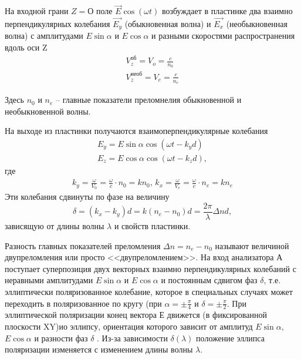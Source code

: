 На входной грани $Z=О$ поле $\vec{E}\cos(\omega t)$ возбуждает
в пластинке два взаимно перпендикулярных колебания $\vec{E_y}$
(обыкновенная волна) и $\vec{E_x}$ (необыкновенная волна) с амплитудами $E\sin\alpha$ и $E\cos\alpha$ и разными скоростями
распространения вдоль оси Z
\begin{gather}
	V_z^{\text{об}}=V_o=\frac{c}{n_0} \\
	V_z^{\text{необ}}=V_e=\frac{c}{n_e}
\end{gather}

Здесь $n_0$ и $n_e$ -- главные показатели преломнелия обыкновенной и необыкновенной волны.

На выходе из пластинки получаются взаимоперпендикулярные колебания
\begin{gather}
	E_y=E\sin\alpha\cos(\omega t -k_yd) \\
	E_z=E\cos\alpha\cos(\omega t -k_zd),
\end{gather}
где
\begin{gather}
	k_y=\frac{\omega}{V_0}=\frac{\omega}{c}\cdot n_0=kn_0, \,
	k_x=\frac{\omega}{V_e}=\frac{\omega}{c}\cdot n_e=kn_e
\end{gather}
Эти колебания сдвинуты по фазе на величину
\begin{equation}
	\label{eq:3.1}
	\delta=(k_x-k_y)d=k(n_e-n_0)d=\frac{2\pi}{\lambda}\Delta nd,
\end{equation}
зависящую от длины волны $\lambda$ и свойств пластинки.

Разность главных показателей преломления $\Delta n=n_e-n_0$
называют величиной двупреломления или просто <<двупреломлением>>.
На вход анализатора А поступает суперпозиция двух векторных
взаимно перпендикулярных колебаний с неравными амплитудами
$E\sin\alpha$ и $E\cos\alpha$ и постоянным сдвигом фаз $\delta$, т.е. эллиптически поляризованное колебание, которое
в специальных случаях может переходить в поляризованное по кру­гу 
(при $\alpha=\pm\frac{\pi}{4}$ и $\delta=\pm\frac{\pi}{2}$. При эллиптической
поляризации конец вектора Е движется (в фиксированной плоскости
XY)ио эллипсу, ориентация которого зависит от амплитуд
$E\sin\alpha$, $E\cos\alpha$ и разности фаз $\delta$ . Из-за
зависимости $\delta(\lambda)$ положение эллипса поляризации изменяется
с изменением длины волны $\lambda$.

